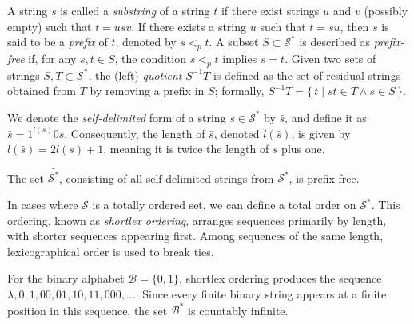 A string $s$ is called a \emph{substring} of a string $t$ if there exist strings $u$ and $v$ (possibly empty) such that $t = usv$. If there exists a string $u$ such that $t = su$, then $s$ is said to be a \emph{prefix} of $t$, denoted by $s <_p t$. A subset $S \subset \mathcal{S}^{\ast}$ is described as \emph{prefix-free} if, for any $s, t \in S$, the condition $s <_p t$ implies $s = t$. Given two sets of strings $S, T \subset \mathcal{S}^{\ast}$, the (left) \emph{quotient} $S^{-1}T$ is defined as the set of residual strings obtained from $T$ by removing a prefix in $S$; formally, $S^{-1}T = \{\, t \mid st \in T \land s \in S \,\}$.

We denote the \emph{self-delimited} form of a string $s \in \mathcal{S}^{\ast}$ by $\bar{s}$, and define it as $\bar{s} = 1^{l(s)}0s$. Consequently, the length of $\bar{s}$, denoted $l(\bar{s})$, is given by $l(\bar{s}) = 2l(s) + 1$, meaning it is twice the length of $s$ plus one.

\begin{example}
The set $\bar{\mathcal{S}^{\ast}}$, consisting of all self-delimited strings from $\mathcal{S}^{\ast}$, is prefix-free.
\end{example}

In cases where $\mathcal{S}$ is a totally ordered set, we can define a total order on $\mathcal{S}^{\ast}$. This ordering, known as \emph{shortlex ordering}, arranges sequences primarily by length, with shorter sequences appearing first. Among sequences of the same length, lexicographical order is used to break ties.

\begin{example}
For the binary alphabet $\mathcal{B} = \{0,1\}$, shortlex ordering produces the sequence $\lambda, 0, 1, 00, 01, 10, 11, 000, \ldots$. Since every finite binary string appears at a finite position in this sequence, the set $\mathcal{B}^*$ is countably infinite.
\end{example}

